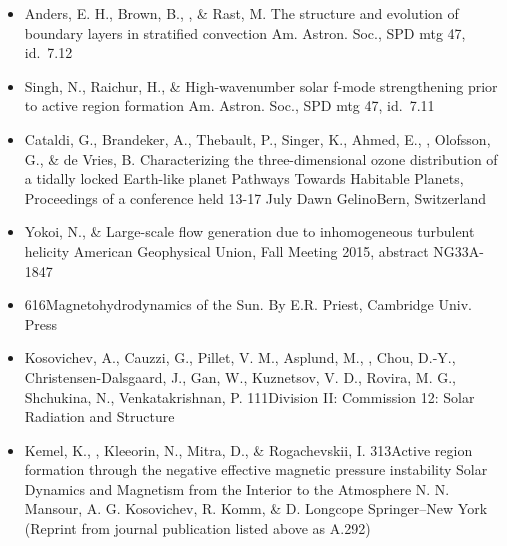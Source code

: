 \begin{itemize}
\item[{46.}~]
Anders, E. H., Brown, B., \Brandenburg, \& Rast, M.
{The structure and evolution of boundary layers in stratified convection}
{Am. Astron. Soc., SPD mtg 47, id.\ 7.12}

\item[{45.}~]
Singh, N., Raichur, H., \& \Brandenburg{}
{High-wavenumber solar f-mode strengthening prior to active region formation}
{Am. Astron. Soc., SPD mtg 47, id.\ 7.11}

\item[{44.}~]
Cataldi, G., Brandeker, A., Thebault, P., Singer, K., Ahmed, E., \Brandenburg, Olofsson, G., \& de Vries, B.
{Characterizing the three-dimensional ozone distribution of a tidally locked Earth-like planet}
{Pathways Towards Habitable Planets, Proceedings of a conference held 13-17 July}
{Dawn Gelino}{Bern, Switzerland}

\item[{43.}~]
Yokoi, N., \& \Brandenburg{}
{Large-scale flow generation due to inhomogeneous turbulent helicity}
{American Geophysical Union, Fall Meeting 2015, abstract NG33A-1847}

\item[{42.}~]
\Brandenburg{}
{616}{Magnetohydrodynamics of the Sun. By E.R. Priest, Cambridge Univ. Press}

\item[{41.}~]
Kosovichev, A., Cauzzi, G., Pillet, V. M., Asplund, M., \Brandenburg, Chou, D.-Y., Christensen-Dalsgaard, J., Gan, W., Kuznetsov, V. D., Rovira, M. G., Shchukina, N., Venkatakrishnan, P.
{111}{Division II: Commission 12: Solar Radiation and Structure}

\item[{40.}~]
Kemel, K., \Brandenburg, Kleeorin, N., Mitra, D., \& Rogachevskii, I.
{313}{Active region formation through the negative effective magnetic pressure instability}
{Solar Dynamics and Magnetism from the Interior to the Atmosphere}
{N. N. Mansour, A. G. Kosovichev, R. Komm, \& D. Longcope}
{Springer--New York}
(Reprint from journal publication listed above as A.292)


\end{itemize}
